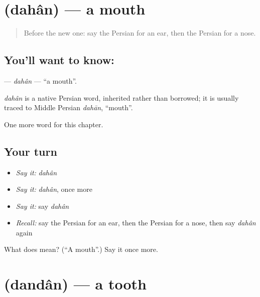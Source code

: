 \section[\texorpdfstring{\fa{دهان} (dahân)}{دهان (dahân)}]{ (dahân) — a mouth}

\label{lesson:FA-C27-dahan}



\begin{quote}
Before the new one: say the Persian for an ear, then the Persian for a nose.
\end{quote}

\subsection*{You'll want to know: }
\textbf{} — \emph{dahân} — \textquotedblleft{}a mouth\textquotedblright{}.

\begin{cousinweb}
\emph{dahân} is a native Persian word, inherited rather than borrowed; it is usually traced to Middle Persian \emph{dahān}, \textquotedblleft{}mouth\textquotedblright{}.
\end{cousinweb}

\begin{grammarlens}[title={What you've built}]
One more word for this chapter.
\end{grammarlens}

\subsection*{Your turn}
\begin{itemize}
\raggedright
  \item \emph{Say it:} \emph{dahân}
  \item \emph{Say it:} \emph{dahân}, once more
  \item \emph{Say it:} say \emph{dahân}
  \item \emph{Recall:} say the Persian for an ear, then the Persian for a nose, then say \emph{dahân} again
\end{itemize}

\begin{tcolorbox}[breakable,colback=teal!4,colframe=teal!35!black,title={Before you move on}]
What does  mean? (\textquotedblleft{}A mouth\textquotedblright{}.) Say it once more.
\end{tcolorbox}
\section[\texorpdfstring{\fa{دندان} (dandân)}{دندان (dandân)}]{ (dandân) — a tooth}

